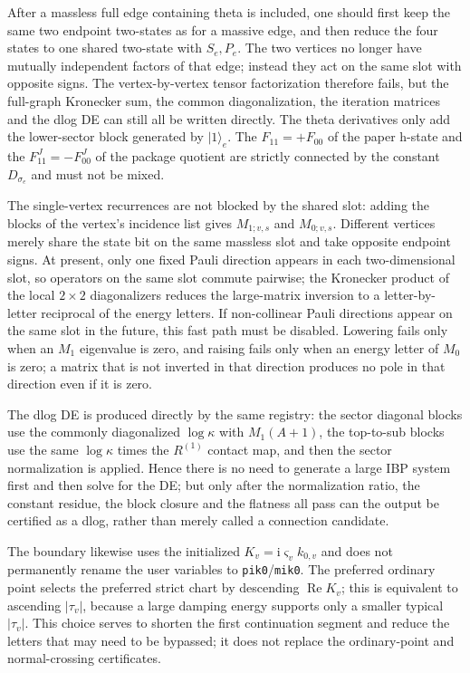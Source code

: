 \documentclass[11pt,a4paper]{article}
\newcommand{\ii}{\mathrm i}
\begin{document}
After a massless full edge containing theta is included, one should first keep the same two endpoint two-states as for a massive edge, and then reduce the four states to one shared two-state with $S_e,P_e$. The two vertices no longer have mutually independent factors of that edge; instead they act on the same slot with opposite signs. The vertex-by-vertex tensor factorization therefore fails, but the full-graph Kronecker sum, the common diagonalization, the iteration matrices and the dlog DE can still all be written directly. The theta derivatives only add the lower-sector block generated by $|1\rangle_e$. The $F_{11}=+F_{00}$ of the paper h-state and the $F_{11}^J=-F_{00}^J$ of the package quotient are strictly connected by the constant $D_{\sigma_e}$ and must not be mixed.

The single-vertex recurrences are not blocked by the shared slot: adding the blocks of the vertex's incidence list gives $M_{1;v,s}$ and $M_{0;v,s}$. Different vertices merely share the state bit on the same massless slot and take opposite endpoint signs. At present, only one fixed Pauli direction appears in each two-dimensional slot, so operators on the same slot commute pairwise; the Kronecker product of the local $2\times2$ diagonalizers reduces the large-matrix inversion to a letter-by-letter reciprocal of the energy letters. If non-collinear Pauli directions appear on the same slot in the future, this fast path must be disabled. Lowering fails only when an $M_1$ eigenvalue is zero, and raising fails only when an energy letter of $M_0$ is zero; a matrix that is not inverted in that direction produces no pole in that direction even if it is zero.

The dlog DE is produced directly by the same registry: the sector diagonal blocks use the commonly diagonalized $\log\kappa$ with $M_1(A+1)$, the top-to-sub blocks use the same $\log\kappa$ times the $R^{(1)}$ contact map, and then the sector normalization is applied. Hence there is no need to generate a large IBP system first and then solve for the DE; but only after the normalization ratio, the constant residue, the block closure and the flatness all pass can the output be certified as a dlog, rather than merely called a connection candidate.

The boundary likewise uses the initialized $K_v=\ii\varsigma_vk_{0,v}$ and does not permanently rename the user variables to \texttt{pik0}/\texttt{mik0}. The preferred ordinary point selects the preferred strict chart by descending $\operatorname{Re}K_v$; this is equivalent to ascending $|\tau_v|$, because a large damping energy supports only a smaller typical $|\tau_v|$. This choice serves to shorten the first continuation segment and reduce the letters that may need to be bypassed; it does not replace the ordinary-point and normal-crossing certificates.
\end{document}
